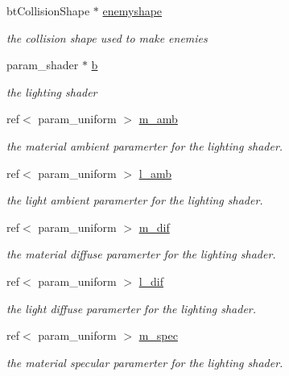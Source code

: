 \begin{DoxyCompactItemize}
bt\+Collision\+Shape $\ast$ \hyperlink{classoctet_1_1minecraft__wars_aa3d199d2f6084140c89c884bb079fb7b}{enemyshape}
\begin{DoxyCompactList}\small\item\em the collision shape used to make enemies \end{DoxyCompactList}\item 
param\+\_\+shader $\ast$ \hyperlink{classoctet_1_1minecraft__wars_a2e5ca51c2373b40b1613c9ad818f7a39}{b}
\begin{DoxyCompactList}\small\item\em the lighting shader \end{DoxyCompactList}\item 
ref$<$ param\+\_\+uniform $>$ \hyperlink{classoctet_1_1minecraft__wars_af42f249968d7364bf5ebaf34aa04e86c}{m\+\_\+amb}
\begin{DoxyCompactList}\small\item\em the material ambient paramerter for the lighting shader. \end{DoxyCompactList}\item 
ref$<$ param\+\_\+uniform $>$ \hyperlink{classoctet_1_1minecraft__wars_aca1e4733d35f84e6e7beb0922091071a}{l\+\_\+amb}
\begin{DoxyCompactList}\small\item\em the light ambient paramerter for the lighting shader. \end{DoxyCompactList}\item 
ref$<$ param\+\_\+uniform $>$ \hyperlink{classoctet_1_1minecraft__wars_a6e9f0bc04242d7dc02663e0d8a385865}{m\+\_\+dif}
\begin{DoxyCompactList}\small\item\em the material diffuse paramerter for the lighting shader. \end{DoxyCompactList}\item 
ref$<$ param\+\_\+uniform $>$ \hyperlink{classoctet_1_1minecraft__wars_ac4e627b56678402ff9581a24725d17c0}{l\+\_\+dif}
\begin{DoxyCompactList}\small\item\em the light diffuse paramerter for the lighting shader. \end{DoxyCompactList}\item 
ref$<$ param\+\_\+uniform $>$ \hyperlink{classoctet_1_1minecraft__wars_a80007ff61c9366fbb63a374b224da78e}{m\+\_\+spec}
\begin{DoxyCompactList}\small\item\em the material specular paramerter for the lighting shader. \end{DoxyCompactList}\item 

\end{DoxyCompactItemize}
